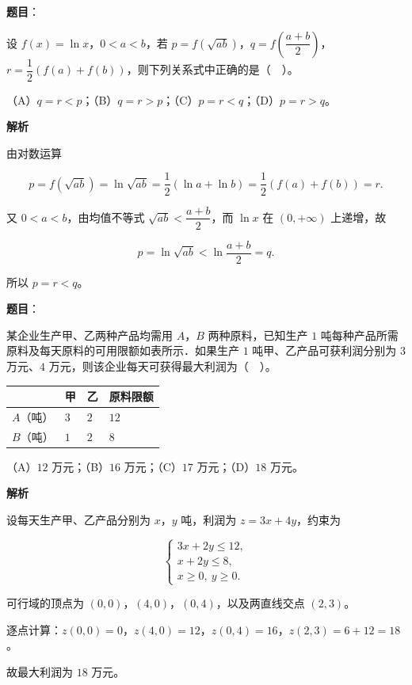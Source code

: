 \begin{answer}

\textbf{题目}：

设 $f(x)=\ln x$，$0<a<b$，若 $p=f\left(\sqrt{ab}\right)$，$q=f\left(\dfrac{a+b}{2}\right)$，$r=\dfrac{1}{2}(f(a)+f(b))$，则下列关系式中正确的是（　）。

（A）$q=r<p$；（B）$q=r>p$；（C）$p=r<q$；（D）$p=r>q$。

\textbf{解析}

由对数运算

\nopagebreak[4]
\[
p=f\left(\sqrt{ab}\right)=\ln\sqrt{ab}=\frac{1}{2}(\ln a+\ln b)=\frac{1}{2}(f(a)+f(b))=r.
\]

又 $0<a<b$，由均值不等式 $\sqrt{ab}<\dfrac{a+b}{2}$，而 $\ln x$ 在 $(0,+\infty)$ 上递增，故

\nopagebreak[4]
\[
p=\ln\sqrt{ab}<\ln\frac{a+b}{2}=q.
\]

所以 $p=r<q$。


\end{answer}
\begin{answer}

\textbf{题目}：

某企业生产甲、乙两种产品均需用 $A$，$B$ 两种原料，已知生产 $1$ 吨每种产品所需原料及每天原料的可用限额如表所示．如果生产 $1$ 吨甲、乙产品可获利润分别为 $3$ 万元、$4$ 万元，则该企业每天可获得最大利润为（　）。

\begin{center}
\begin{tabular}{llll}
\toprule
 & 甲 & 乙 & 原料限额 \\
\midrule
$A$（吨） & $3$ & $2$ & $12$ \\
$B$（吨） & $1$ & $2$ & $8$ \\
\bottomrule
\end{tabular}
\end{center}

（A）$12$ 万元；（B）$16$ 万元；（C）$17$ 万元；（D）$18$ 万元。

\textbf{解析}

设每天生产甲、乙产品分别为 $x$，$y$ 吨，利润为 $z=3x+4y$，约束为

\nopagebreak[4]
\[
\begin{cases}
3x+2y\le 12,\\
x+2y\le 8,\\
x\ge 0,\ y\ge 0.
\end{cases}
\]

可行域的顶点为 $(0,0)$，$(4,0)$，$(0,4)$，以及两直线交点 $(2,3)$。

逐点计算：$z(0,0)=0$，$z(4,0)=12$，$z(0,4)=16$，$z(2,3)=6+12=18$。

故最大利润为 $18$ 万元。


\end{answer}
